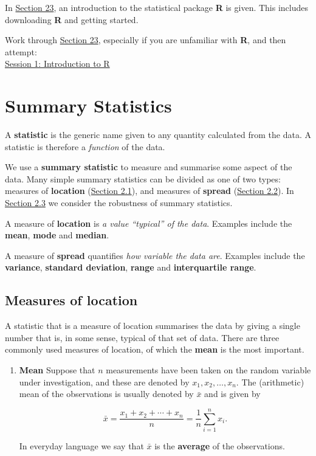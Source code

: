 \documentclass[
]{book}
\providecommand{\tightlist}{%
  \setlength{\itemsep}{0pt}\setlength{\parskip}{0pt}}
\begin{document}
In \protect\hyperlink{introR}{Section 23}, an introduction to the statistical package \textbf{R} is given. This includes downloading \textbf{R} and getting started.

Work through \protect\hyperlink{introR}{Section 23}, especially if you are unfamiliar with \textbf{R}, and then attempt:\\
\href{https://moodle.nottingham.ac.uk/course/view.php?id=134982\#section-2}{Session 1: Introduction to R}

\hypertarget{summary}{%
\chapter{Summary Statistics}\label{summary}}

A \textbf{statistic} is the generic name given to any quantity calculated from the data. A statistic is therefore a \emph{function} of the data.

We use a \textbf{summary statistic} to measure and summarise some aspect of the data. Many simple summary statistics can be divided as one of two types: measures of
\textbf{location} (\protect\hyperlink{summary_location}{Section 2.1}), and measures of \textbf{spread} (\protect\hyperlink{summary_spread}{Section 2.2}). In \protect\hyperlink{summary_robust}{Section 2.3} we consider the robustness of summary statistics.

A measure of \textbf{location} is \emph{a value ``typical'' of the data}. Examples include the \textbf{mean}, \textbf{mode} and \textbf{median}.

A measure of \textbf{spread} quantifies \emph{how variable the data are}. Examples include the \textbf{variance}, \textbf{standard deviation}, \textbf{range} and \textbf{interquartile range}.

\hypertarget{summary_location}{%
\section{Measures of location}\label{summary_location}}

A statistic that is a measure of location summarises the data by giving
a single number that is, in some sense, typical of that set of data.
There are three commonly used measures of location, of which the
\textbf{mean} is the most important.

\begin{enumerate}
\def\labelenumi{\arabic{enumi}.}
\tightlist
\item
  {\textbf{Mean}} Suppose that \(n\) measurements have been taken on the
  random variable under investigation, and these are denoted by
  \(x_1 , x_2 , \ldots , x_n\). The (arithmetic) mean of the
  observations is usually denoted by \(\bar{x}\) and is given by

  \begin{equation}
  \bar{x} = \frac{x_1 + x_2 + \cdots + x_n}{n} = \frac{1}{n} \sum\limits_{i=1}^n x_i.
  \label{eq:samplemean}
  \end{equation}

  In everyday language we say that \(\bar {x}\) is the \textbf{average} of
  the observations.
\end{enumerate}
\end{document}
